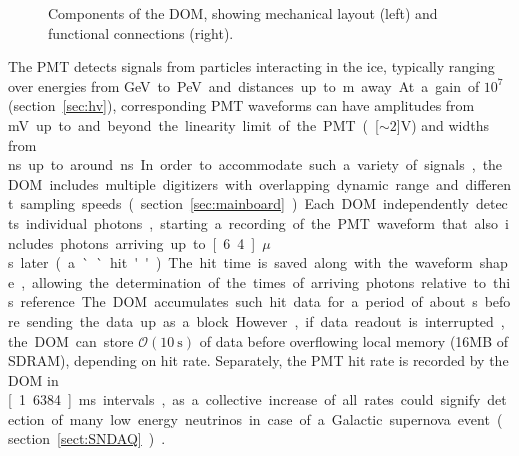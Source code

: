 \begin{figure}[!h]
  \captionsetup[subfigure]{labelformat=empty}
  \centering
  \caption{Components of the DOM, showing mechanical layout (left) and functional connections (right).}
  \label{fig:domcomponents}
\end{figure}



The PMT detects signals from particles interacting in the ice, typically ranging over
energies from \unit[10]GeV to \unit[10]PeV and distances up to \unit[500]m
away.  At a gain of $10^7$ (section~\ref{sec:hv}), corresponding PMT waveforms can have amplitudes from \unit[1]mV up
to and beyond the linearity limit of the PMT (\unit[$\sim2$]V) and widths
from \unit[12]ns up to around \unit[1500]ns.  In order to accommodate such a variety
of signals, the DOM includes multiple digitizers with overlapping dynamic
range and different sampling speeds
(section~\ref{sec:mainboard}).  Each DOM independently
detects individual photons, starting a recording of
the PMT waveform that also includes photons arriving up to
\unit[6.4]{$\mu$s} later (a ``hit'').  The hit time is saved along with the
waveform shape, allowing the determination of the times of arriving photons
relative to this reference.  The DOM accumulates such hit
data for a period of about \unit[1]s before sending the data up as a block.
However, if data readout is interrupted, the DOM can store
$\mathcal{O}(\SI{10}{\second})$ of data before overflowing local memory
(16MB of SDRAM), depending on hit rate.  Separately, the PMT hit rate is recorded by
the DOM in \unit[1.6384]ms intervals, as a collective increase of all rates
could signify detection of many low energy neutrinos in case of a Galactic
supernova event (section~\ref{sect:SNDAQ}) \cite{IC3:supernova}.

